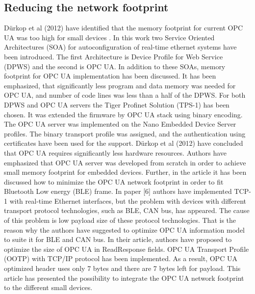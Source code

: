 \documentclass[conference]{IEEEtran}
\begin{document}
\subsection{Reducing the network footprint}
Dürkop et al (2012) have identified that the memory footprint for current OPC UA was too high for small devices \cite{durkop2012service}. In this work \cite{durkop2012service} two Service Oriented Architectures (SOA) for autoconfiguration of real-time ethernet systems have been introduced. The first Architecture is Device Profile for Web Service (DPWS) and the second is OPC UA. In addition to these SOAs, memory footprint for OPC UA implementation has been discussed. It has been emphasized, that significantly less program and data memory was needed for OPC UA, and number of code lines was less than a half of the DPWS. For both DPWS and OPC UA servers the Tiger Profinet Solution (TPS-1) has been chosen. It was extended the firmware by OPC UA stack using binary encoding. The OPC UA server was implemented on the Nano Embedded Device Server profiles. The binary transport profile was assigned, and the authentication using certificates have been used for the support. Dürkop et al (2012) have concluded that OPC UA requires significantly less hardware resources. Authors have emphasized that OPC UA server was developed from scratch in order to achieve small memory footprint for embedded devices. Further, in the article \cite{shrestha2013optimized} it has been discussed how to minimize the OPC UA network footprint in order to fit Bluetooth Low energy (BLE) frame. In paper [6] authors have implemented TCP-1 with real-time Ethernet interfaces, but the problem with devices with different transport protocol technologies, such as BLE, CAN bus, has appeared. The cause of this problem is low payload size of these protocol technologies. That is the reason why the authors \cite{shrestha2013optimized} have suggested to optimize OPC UA information model to suite it for BLE and CAN bus. In their article, authors have proposed to optimize the size of OPC UA in ReadResponse fields. OPC UA Transport Profile (OOTP) with TCP/IP protocol has been implemented. As a result, OPC UA optimized header uses only 7 bytes and there are 7 bytes left for payload. This article has presented the possibility to integrate the OPC UA network footprint to the different small devices.
\end{document}
